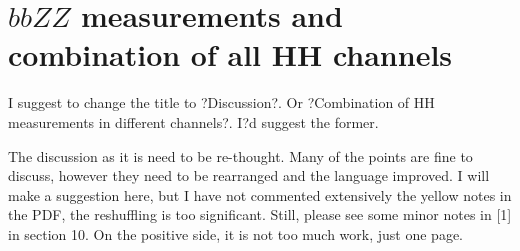 %
%
%

\section{$bbZZ$ measurements and combination of all HH channels}
\label{sec:bbZZcombination}

  I suggest to change the title to  ?Discussion?. Or ?Combination of HH measurements in different channels?.
I?d suggest the former.

   The discussion as it is need to be re-thought. Many of the points are fine to discuss,
however they need to be rearranged and the language improved. I will make a suggestion
here, but I have not commented extensively the yellow notes in the PDF, the reshuffling is  too significant.
Still, please see some minor notes in [1] in section 10.
  On the positive side, it is not too much work,  just one page.

